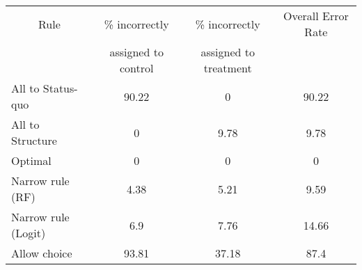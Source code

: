 \begin{tabular}{lccc}
\toprule
\multicolumn{1}{c}{Rule} & \% incorrectly  & \% incorrectly  & Overall Error Rate \\
      & assigned to control  &  assigned to treatment &  \\
\midrule
\midrule
All to Status-quo & 90.22 & 0     & 90.22 \\
All to Structure & 0     & 9.78  & 9.78 \\
Optimal & 0     & 0     & 0 \\
Narrow rule (RF) & 4.38  & 5.21  & 9.59 \\
Narrow rule (Logit) & 6.9   & 7.76  & 14.66 \\
Allow choice & 93.81 & 37.18 & 87.4 \\
\bottomrule
\bottomrule
\end{tabular}%

